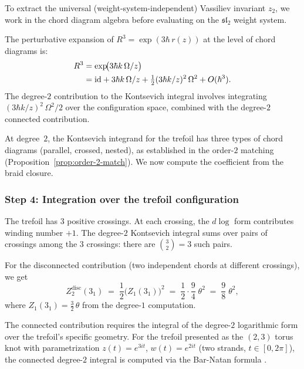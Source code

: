\documentclass[11pt]{article}
\newcommand{\fsl}{\mathfrak{sl}}
\newcommand{\id}{\mathrm{id}}
\begin{document}
To extract the universal (weight-system-independent) Vassiliev
invariant $z_2$, we work in the chord diagram algebra before
evaluating on the $\fsl_2$ weight system.

The perturbative expansion of $R^3 = \exp(3\hbar\,r(z))$ at the
level of chord diagrams is:
\begin{align}
  R^3
  &= \exp\!\bigl(3\hbar k\,\Omega/z\bigr)
  \notag\\
  &= \id
  + 3\hbar k\,\Omega/z
  + \tfrac{1}{2}(3\hbar k/z)^2\,\Omega^2
  + O(\hbar^3).
  \label{eq:R-cubed-expansion}
\end{align}
The degree-$2$ contribution to the Kontsevich integral involves
integrating $(3\hbar k/z)^2\,\Omega^2/2$ over the
configuration space, combined with the degree-$2$ connected
contribution.

At degree~$2$, the Kontsevich integrand for the trefoil has
three types of chord diagrams (parallel, crossed, nested),
as established in the order-$2$ matching (Proposition~\ref{prop:order-2-match}).  We now
compute the coefficient from the braid closure.

\subsubsection{Step 4: Integration over the trefoil configuration}

The trefoil has $3$ positive crossings.  At each crossing, the
$d\log$ form contributes winding number $+1$.  The degree-$2$
Kontsevich integral sums over pairs of crossings among the $3$
crossings: there are $\binom{3}{2} = 3$ such pairs.

For the disconnected contribution (two independent chords at
different crossings), we get
\begin{equation}\label{eq:degree-2-disconnected}
  Z_2^{\mathrm{disc}}(3_1)
  \;=\;
  \frac{1}{2}\bigl(Z_1(3_1)\bigr)^2
  \;=\;
  \frac{1}{2}\cdot\frac{9}{4}\;\theta^2
  \;=\;
  \frac{9}{8}\;\theta^2,
\end{equation}
where $Z_1(3_1) = \frac{3}{2}\,\theta$ from the degree-$1$ computation.

The connected contribution requires the integral of the
degree-$2$ logarithmic form over the trefoil's specific geometry.
For the trefoil presented as the $(2,3)$ torus knot with
parametrization $z(t) = e^{3it}$, $w(t) = e^{2it}$
(two strands, $t \in [0, 2\pi]$), the connected degree-$2$
integral is computed via the Bar-Natan formula
\cite{BarNatan95}.
\end{document}
